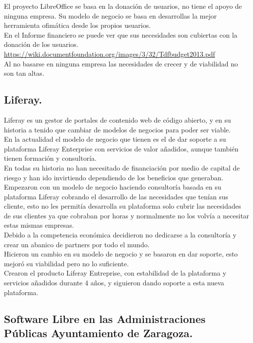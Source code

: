 \documentclass[12pt]{article} %
\begin{document}
El proyecto LibreOffice se basa en la donación de usuarios, no tiene el apoyo de ninguna empresa. Su modelo de negocio se basa en desarrollas la mejor herramienta ofimática desde los propios usuarios. \\En el Informe financiero se puede ver que sus necesidades son cubiertas con la donación de los usuarios. \url {https://wiki.documentfoundation.org/images/3/32/Tdfbudget2013.pdf}\\Al no basarse en ninguna empresa las necesidades de crecer y de viabilidad no son tan altas. 


\subsection{Liferay.} %

Liferay es un gestor de portales de contenido web de código abierto, y en su historia a tenido que cambiar de modelos de negocios para poder ser viable.\\En la actualidad el modelo de negocio que tienen es el de dar soporte a su plataforma Liferay Enterprise con servicios de valor añadidos, aunque también tienen formación y consultoría.\\En todas su historia no han necesitado de financiación por medio de capital de riesgo y han ido invirtiendo dependiendo de los beneficios que generaban.\\Empezaron con un modelo de negocio haciendo consultoría basada en su plataforma Liferay cobrando el desarrollo de las necesidades que tenían sus cliente, esto no les permitía desarrolla su plataforma solo cubrir las necesidades de sus clientes ya que cobraban por horas y normalmente no los volvía a necesitar estas mismas empresas.\\ Debido a la competencia económica decidieron no dedicarse a la consultoría y crear un abanico de partners por todo el mundo.\\Hicieron un cambio en su modelo de negocio y se basaron en dar soporte, esto mejoró su viabilidad pero no lo suficiente.
\\Crearon el producto Liferay Entreprise, con estabilidad de la plataforma y servicios añadidos durante 4 años, y siguieron dando soporte a esta nueva plataforma.

\subsection{Software Libre en las Administraciones Públicas Ayuntamiento de Zaragoza.} %
\end{document}
